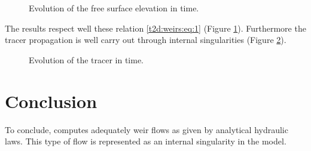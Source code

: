 \begin{figure}[H]
 \centering
 \caption{Evolution of the free surface elevation in time.}
 \label{t2d:weirs:fig:z}
\end{figure}

The  results respect well these relation \eqref{t2d:weirs:eq:1}
(Figure  \ref{t2d:weirs:fig:z}). Furthermore the tracer propagation is well
 carry out through internal singularities (Figure \ref{t2d:weirs:fig:tracer}).

\begin{figure}[H]
 \centering
 \caption{Evolution of the tracer in time.}
 \label{t2d:weirs:fig:tracer}
\end{figure}

\section{Conclusion}
To conclude,  computes adequately weir
flows as given by analytical hydraulic laws.
This type of flow is represented as an internal
 singularity in the model.
%
